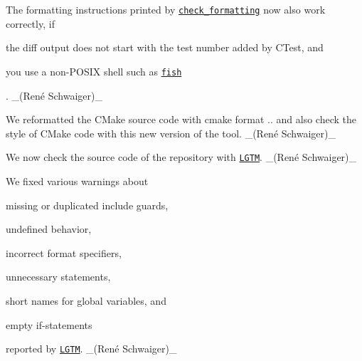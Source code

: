 \begin{DoxyItemize}
\item The formatting instructions printed by \href{https://master.libelektra.org/tests/shell/check_formatting.sh}{\tt {\ttfamily check\+\_\+formatting}} now also work correctly, if
\begin{DoxyItemize}
\item the {\ttfamily diff} output does not start with the test number added by C\+Test, and
\item you use a non-\/\+P\+O\+S\+IX shell such as \href{https://fishshell.com}{\tt {\ttfamily fish}}
\end{DoxyItemize}

. \+\_\+(René Schwaiger)\+\_\+
\item We reformatted the C\+Make source code with cmake format {..} and also check the style of C\+Make code with this new version of the tool. \+\_\+(René Schwaiger)\+\_\+
\item We now check the source code of the repository with \href{https://lgtm.com}{\tt L\+G\+TM}. \+\_\+(René Schwaiger)\+\_\+
\item We fixed various warnings about
\begin{DoxyItemize}
\item missing or duplicated include guards,
\item undefined behavior,
\item incorrect format specifiers,
\item unnecessary statements,
\item short names for global variables, and
\item empty {\ttfamily if}-\/statements
\end{DoxyItemize}

reported by \href{https://lgtm.com}{\tt L\+G\+TM}. \+\_\+(René Schwaiger)\+\_\+
\end{DoxyItemize}


